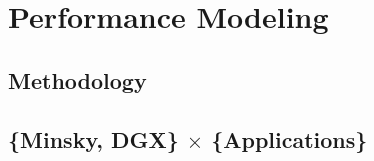 \chapter{Performance Modeling}

\section{Methodology}

\section{\{Minsky, DGX\} $\times$ \{Applications\}}